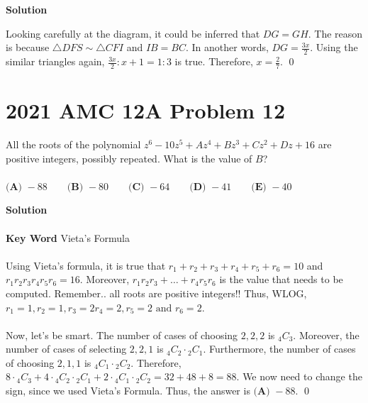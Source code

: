 \documentclass{article}
\newenvironment{solution}{\begin{trivlist}\item[]{\bf Solution}}{\qed \end{trivlist}}
\begin{document}
\begin{solution}
\begin{center}
\end{center}
Looking carefully at the diagram, it could be inferred that $DG=GH$. The reason is because $\triangle{DFS}\sim\triangle{CFI}$ and $IB=BC$. In another words, $DG=\frac{3x}{2}$. Using the similar triangles again, $\frac{3x}{2}:x+1=1:3$ is true. Therefore, $x=\boxed{\frac{2}{7}}$.
\end{solution}

\section*{2021 AMC 12A Problem 12}
All the roots of the polynomial $z^6-10z^5+Az^4+Bz^3+Cz^2+Dz+16$ are positive integers, possibly repeated. What is the value of $B$?
\\\\
$\textbf{(A) }{-}88 \qquad \textbf{(B) }{-}80 \qquad \textbf{(C) }{-}64 \qquad \textbf{(D) }{-}41\qquad \textbf{(E) }{-}40$
\begin{solution}
\\\\
\textbf{Key Word} Vieta's Formula
\\\\
Using Vieta's formula, it is true that $r_1+r_2+r_3+r_4+r_5+r_6=10$ and $r_1r_2r_3r_4r_5r_6=16$. Moreover, $r_1r_2r_3+\dots+r_4r_5r_6$ is the value that needs to be computed. Remember.. all roots are positive integers!! Thus, WLOG, $r_1=1,r_2=1,r_3=2r_4=2,r_5=2\text{ and }r_6=2$.
\\\\
Now, let's be smart. The number of cases of choosing $2,2,2$ is ${}_4C_3$. Moreover, the number of cases of selecting $2,2,1$ is ${}_4C_2\cdot{}_2C_1$. Furthermore, the number of cases of choosing $2,1,1$ is ${}_4C_1\cdot{}_2C_2$. Therefore, $8\cdot{}_4C_3+4\cdot{}_4C_2\cdot{}_2C_1+2\cdot{}_4C_1\cdot{}_2C_2=32+48+8=88$. We now need to change the sign, since we used Vieta's Formula. Thus, the answer is $\boxed{\textbf{(A) }{-}88}$.
\end{solution}
\end{document}
